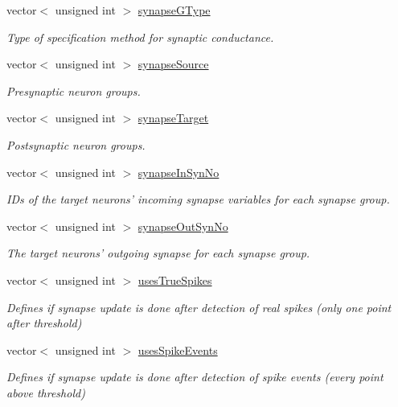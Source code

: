 \begin{DoxyCompactItemize}
vector$<$ unsigned int $>$ \hyperlink{classNNmodel_a521aa25f9cc763dab52769da0b775470}{synapse\+G\+Type}
\begin{DoxyCompactList}\small\item\em Type of specification method for synaptic conductance. \end{DoxyCompactList}\item 
vector$<$ unsigned int $>$ \hyperlink{classNNmodel_a39861eefc8f7b13c21aaf82142520227}{synapse\+Source}
\begin{DoxyCompactList}\small\item\em Presynaptic neuron groups. \end{DoxyCompactList}\item 
vector$<$ unsigned int $>$ \hyperlink{classNNmodel_a10c4e0a9d71bbfa6895de30a64f31ca6}{synapse\+Target}
\begin{DoxyCompactList}\small\item\em Postsynaptic neuron groups. \end{DoxyCompactList}\item 
vector$<$ unsigned int $>$ \hyperlink{classNNmodel_adc8ccfb003c34fbca10d0fd0e3b26ee0}{synapse\+In\+Syn\+No}
\begin{DoxyCompactList}\small\item\em I\+Ds of the target neurons' incoming synapse variables for each synapse group. \end{DoxyCompactList}\item 
vector$<$ unsigned int $>$ \hyperlink{classNNmodel_a7d6d9860957c931725cead04ee0d6d98}{synapse\+Out\+Syn\+No}
\begin{DoxyCompactList}\small\item\em The target neurons' outgoing synapse for each synapse group. \end{DoxyCompactList}\item 
vector$<$ unsigned int $>$ \hyperlink{classNNmodel_a5d70d70919f892c66196fdea7cb13a45}{uses\+True\+Spikes}
\begin{DoxyCompactList}\small\item\em Defines if synapse update is done after detection of real spikes (only one point after threshold) \end{DoxyCompactList}\item 
vector$<$ unsigned int $>$ \hyperlink{classNNmodel_a5d1a849b688fd0b7fdb999d39b5e049b}{uses\+Spike\+Events}
\begin{DoxyCompactList}\small\item\em Defines if synapse update is done after detection of spike events (every point above threshold) \end{DoxyCompactList}\item 

\end{DoxyCompactItemize}
